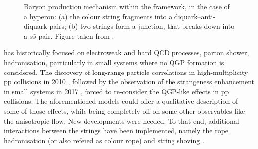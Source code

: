 \begin{figure}[t]
\hspace*{-1.25cm}
\caption{Baryon production mechanism within the \Pythia framework, in the case of a \rmXiM hyperon: (a) the colour string fragments into a diquark--anti-diquark pairs; (b) two strings form a junction, that breaks down into a $s\bar{s}$ pair. Figure taken from \cite{adolfssonQCDChallengesPp2020}.}
	\label{fig:BaryonProductionMechanisms}
\end{figure}

\Pythia has historically focused on electroweak and hard QCD processes, parton shower, hadronisation, particularly in small systems where no QGP formation is considered. The discovery of long-range particle correlations in high-multiplicity pp collisions in 2010 \cite{cmscollaborationObservationLongRangeNearSide2010}\cite{chatrchyanObservationLongrangeNearside2013}\cite{rolandLongrangeCorrelationsHigh2015}, followed by the observation of the strangeness enhancement in small systems in 2017 \cite{alicecollaborationEnhancedProductionMultistrange2017}, forced to re-consider the QGP-like effects in pp collisions. The aforementioned models could offer a qualitative description of some of those effects, while being completely off on some other observables like the anisotropic flow. New developments were needed. To that end, additional interactions between the strings have  been implemented, namely the rope hadronisation (or also refered as colour rope) and string shoving \cite{bierlichComprehensiveGuidePhysics2022}.

